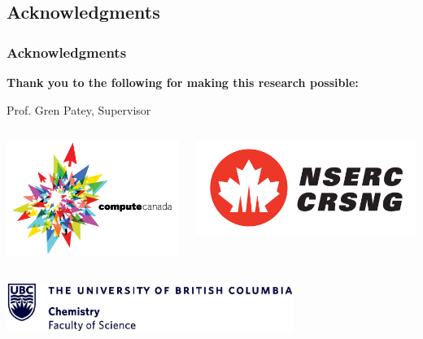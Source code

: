 \documentclass{beamer}
\begin{document}
\subsection{Acknowledgments}
\begin{frame}
\frametitle{Acknowledgments}
	\textbf{Thank you to the following for making this research possible:}\\
\begin{center}
	\Large{Prof. Gren Patey, Supervisor}\\
\end{center}
\begin{columns}
	\begin{column}{0.5\textwidth}
	\includegraphics[trim={0cm 0cm 0cm 0cm},clip,width=\textwidth]{figures/ComputeCanada_logo.png}
	\end{column}
	\begin{column}{0.5\textwidth}
	\includegraphics[trim={0cm 0cm 0cm 0cm},clip,width=\textwidth]{figures/NSERC.png}
	\end{column}
\end{columns}
\begin{center}
\includegraphics[trim={0cm 0cm 0cm 0cm},clip,width=0.7\textwidth]{figures/UBC_Chemlogo.eps}
\end{center}
\end{frame}
\end{document}
